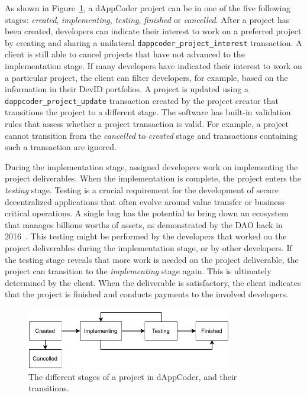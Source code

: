 As shown in Figure~\ref{fig:devid_project}, a dAppCoder project can be in one of the five following stages: \emph{created}, \emph{implementing}, \emph{testing}, \emph{finished} or \emph{cancelled}.
After a project has been created, developers can indicate their interest to work on a preferred project by creating and sharing a unilateral \texttt{dappcoder\_project\_interest} transaction.
A client is still able to cancel projects that have not advanced to the implementation stage.
If many developers have indicated their interest to work on a particular project, the client can filter developers, for example, based on the information in their DevID portfolios.
A project is updated using a \texttt{dappcoder\_project\_update} transaction created by the project creator that transitions the project to a different stage.
The \Dappcoder{} software has built-in validation rules that assess whether a project transaction is valid.
For example, a project cannot transition from the \emph{cancelled} to \emph{created} stage and transactions containing such a transaction are ignored.

During the implementation stage, assigned developers work on implementing the project deliverables.
When the implementation is complete, the project enters the \emph{testing} stage.
Testing is a crucial requirement for the development of secure decentralized applications that often evolve around value transfer or business-critical operations.
A single bug has the potential to bring down an ecosystem that manages billions worths of assets, as demonstrated by the DAO hack in 2016~\cite{dhillon2017dao}.
This testing might be performed by the developers that worked on the project deliverables during the implementation stage, or by other developers.
If the testing stage reveals that more work is needed on the project deliverable, the project can transition to the \emph{implementing} stage again.
This is ultimately determined by the client.
When the deliverable is satisfactory, the client indicates that the project is finished and conducts payments to the involved developers.

\begin{figure}[t!]
	\centering
	\includegraphics[width=0.8\textwidth]{devid/resources/devid_project.pdf}
	\caption{The different stages of a project in dAppCoder, and their transitions.}
	\label{fig:devid_project}
\end{figure}

